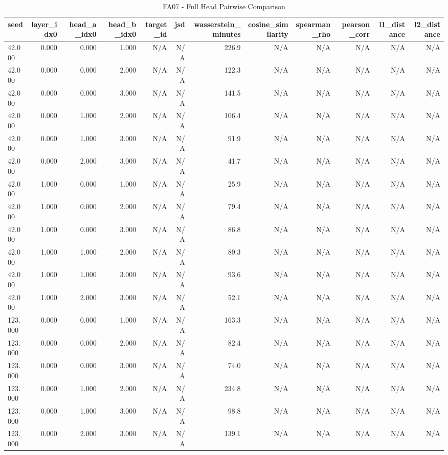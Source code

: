 \begin{table}[h!]
\centering
\caption{FA07 - Full Head Pairwise Comparison}
\label{tab:fa07\_-\_full\_head\_pairwise\_comparison}
\begin{tabular}{lrrrrrrrrrrr}
\toprule
seed & layer\_idx0 & head\_a\_idx0 & head\_b\_idx0 & target\_id & jsd & wasserstein\_minutes & cosine\_similarity & spearman\_rho & pearson\_corr & l1\_distance & l2\_distance \\
\midrule
42.000 & 0.000 & 0.000 & 1.000 & N/A & N/A & 226.9 & N/A & N/A & N/A & N/A & N/A \\
42.000 & 0.000 & 0.000 & 2.000 & N/A & N/A & 122.3 & N/A & N/A & N/A & N/A & N/A \\
42.000 & 0.000 & 0.000 & 3.000 & N/A & N/A & 141.5 & N/A & N/A & N/A & N/A & N/A \\
42.000 & 0.000 & 1.000 & 2.000 & N/A & N/A & 106.4 & N/A & N/A & N/A & N/A & N/A \\
42.000 & 0.000 & 1.000 & 3.000 & N/A & N/A & 91.9 & N/A & N/A & N/A & N/A & N/A \\
42.000 & 0.000 & 2.000 & 3.000 & N/A & N/A & 41.7 & N/A & N/A & N/A & N/A & N/A \\
42.000 & 1.000 & 0.000 & 1.000 & N/A & N/A & 25.9 & N/A & N/A & N/A & N/A & N/A \\
42.000 & 1.000 & 0.000 & 2.000 & N/A & N/A & 79.4 & N/A & N/A & N/A & N/A & N/A \\
42.000 & 1.000 & 0.000 & 3.000 & N/A & N/A & 86.8 & N/A & N/A & N/A & N/A & N/A \\
42.000 & 1.000 & 1.000 & 2.000 & N/A & N/A & 89.3 & N/A & N/A & N/A & N/A & N/A \\
42.000 & 1.000 & 1.000 & 3.000 & N/A & N/A & 93.6 & N/A & N/A & N/A & N/A & N/A \\
42.000 & 1.000 & 2.000 & 3.000 & N/A & N/A & 52.1 & N/A & N/A & N/A & N/A & N/A \\
123.000 & 0.000 & 0.000 & 1.000 & N/A & N/A & 163.3 & N/A & N/A & N/A & N/A & N/A \\
123.000 & 0.000 & 0.000 & 2.000 & N/A & N/A & 82.4 & N/A & N/A & N/A & N/A & N/A \\
123.000 & 0.000 & 0.000 & 3.000 & N/A & N/A & 74.0 & N/A & N/A & N/A & N/A & N/A \\
123.000 & 0.000 & 1.000 & 2.000 & N/A & N/A & 234.8 & N/A & N/A & N/A & N/A & N/A \\
123.000 & 0.000 & 1.000 & 3.000 & N/A & N/A & 98.8 & N/A & N/A & N/A & N/A & N/A \\
123.000 & 0.000 & 2.000 & 3.000 & N/A & N/A & 139.1 & N/A & N/A & N/A & N/A & N/A \\

\end{tabular}
\end{table}
